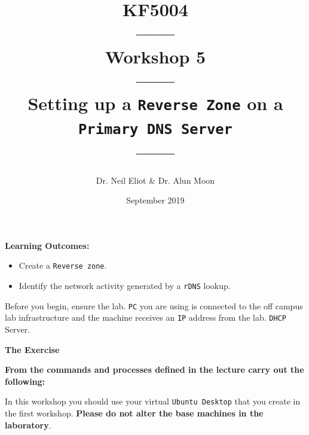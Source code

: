 \documentclass[11pt]{article}
\begin{document}
\author{Dr. Neil Eliot \& Dr. Alun Moon}
\title{KF5004\\------\\Workshop 5\\------\\Setting up a \texttt{Reverse Zone} on a \texttt{Primary DNS Server}\\------}
\date{September 2019}
\maketitle

\newpage



\noindent\textbf{Learning Outcomes:}
\begin{itemize}
    \item Create a \texttt{Reverse zone}.
    \item Identify the network activity generated by a \texttt{rDNS} lookup.
\end{itemize}


\begin{tcolorbox}[title={\textbf{Important:}}]
    Before you begin, ensure the lab. \texttt{PC} you are using is connected to the off campus lab infrastructure and the machine receives an \texttt{IP} address from the lab. \texttt{DHCP} Server.
\end{tcolorbox}
\newpage

\noindent\textbf{The Exercise}\\
\begin{tcolorbox}[colback=blue!20]
    \noindent\textbf{From the commands and processes defined in the lecture carry out the following:}
\end{tcolorbox}


\begin{tcolorbox}[title={\textbf{NOTE:}}]
    In this workshop you should use your virtual \texttt{Ubuntu Desktop} that you create in the first workshop. \textbf{Please do not alter the base machines in the laboratory}.
\end{tcolorbox}
\end{document}
